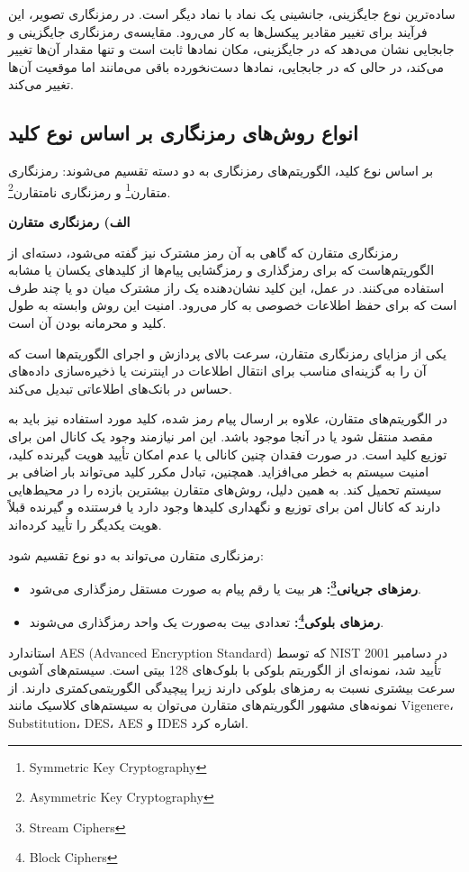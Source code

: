 \documentclass[a4paper,12pt]{report}
\renewcommand{\%}{\lr{\oldpercent}}
\providecommand{\lr}[1]{#1}
\providecommand{\LTRfootnote}[1]{\footnote{#1}}
\begin{document}
ساده‌ترین نوع جایگزینی، جانشینی یک نماد با نماد دیگر است. در رمزنگاری تصویر، این فرآیند برای تغییر مقادیر پیکسل‌ها به کار می‌رود. مقایسه‌ی رمزنگاری جایگزینی و جابجایی نشان می‌دهد که در جایگزینی، مکان نمادها ثابت است و تنها مقدار آن‌ها تغییر می‌کند، در حالی که در جابجایی، نمادها دست‌نخورده باقی می‌مانند اما موقعیت آن‌ها تغییر می‌کند\cite{ref22, ref24}.

\subsection{انواع روش‌های رمزنگاری بر اساس نوع کلید}
بر اساس نوع کلید، الگوریتم‌های رمزنگاری به دو دسته تقسیم می‌شوند: رمزنگاری متقارن\LTRfootnote{Symmetric Key Cryptography} و رمزنگاری نامتقارن\LTRfootnote{Asymmetric Key Cryptography}\cite{ref25}.

\textbf{الف) رمزنگاری متقارن}

رمزنگاری متقارن که گاهی به آن رمز مشترک نیز گفته می‌شود، دسته‌ای از الگوریتم‌هاست که برای رمزگذاری و رمزگشایی پیام‌ها از کلیدهای یکسان یا مشابه استفاده می‌کنند. در عمل، این کلید نشان‌دهنده یک راز مشترک میان دو یا چند طرف است که برای حفظ اطلاعات خصوصی به کار می‌رود. امنیت این روش وابسته به طول کلید و محرمانه بودن آن است. 

یکی از مزایای رمزنگاری متقارن، سرعت بالای پردازش و اجرای الگوریتم‌ها است که آن را به گزینه‌ای مناسب برای انتقال اطلاعات در اینترنت یا ذخیره‌سازی داده‌های حساس در بانک‌های اطلاعاتی تبدیل می‌کند\cite{ref26}.


در الگوریتم‌های متقارن، علاوه بر ارسال پیام رمز شده، کلید مورد استفاده نیز باید به مقصد منتقل شود یا در آنجا موجود باشد. این امر نیازمند وجود یک کانال امن برای توزیع کلید است. در صورت فقدان چنین کانالی یا عدم امکان تأیید هویت گیرنده کلید، امنیت سیستم به خطر می‌افزاید. همچنین، تبادل مکرر کلید می‌تواند بار اضافی بر سیستم تحمیل کند. به همین دلیل، روش‌های متقارن بیشترین بازده را در محیط‌هایی دارند که کانال امن برای توزیع و نگهداری کلیدها وجود دارد یا فرستنده و گیرنده قبلاً هویت یکدیگر را تأیید کرده‌اند.

رمزنگاری متقارن می‌تواند به دو نوع تقسیم شود:
\begin{itemize}
    \item \textbf{رمزهای جریانی\LTRfootnote{Stream Ciphers}:} هر بیت یا رقم پیام به صورت مستقل رمزگذاری می‌شود.
    \item \textbf{رمزهای بلوکی\LTRfootnote{Block Ciphers}:} تعدادی بیت به‌صورت یک واحد رمزگذاری می‌شوند.
\end{itemize}

استاندارد \lr{AES} (\lr{Advanced Encryption Standard}) که توسط \lr{NIST} در دسامبر 2001 تأیید شد، نمونه‌ای از الگوریتم بلوکی با بلوک‌های 128 بیتی است. سیستم‌های آشوبی سرعت بیشتری نسبت به رمزهای بلوکی دارند زیرا پیچیدگی الگوریتمی‌کمتری دارند. از نمونه‌های مشهور الگوریتم‌های متقارن می‌توان به سیستم‌های کلاسیک مانند \lr{Vigenere}، \lr{Substitution}، \lr{DES}، \lr{AES} و \lr{IDES} اشاره کرد\cite{ref25, ref27}.
\end{document}
